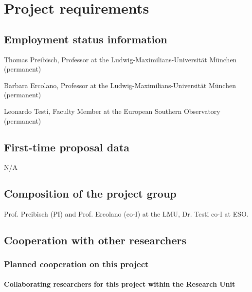\documentclass[10pt,fleqn,twoside]{article}
\begin{document}


\section{Project requirements}
\renewcommand{\leftmark}{\sc Project requirements}

\subsection{Employment status information}

Thomas Preibisch, Professor at the Ludwig-Maximilians-Universit\"at M\"unchen  (permanent)

Barbara Ercolano, Professor at the Ludwig-Maximilians-Universit\"at M\"unchen  (permanent)

Leonardo Testi, Faculty Member at the European Southern Observatory  (permanent)

\subsection{First-time proposal data}

N/A
\vspace{-2mm}

\subsection{Composition of the project group}

Prof. Preibisch (PI) and Prof. Ercolano (co-I) at the LMU, Dr. Testi
co-I at ESO. 


\subsection{Cooperation with other researchers}

\subsubsection{Planned cooperation on this project}

\paragraph{Collaborating researchers for this project within the
  Research Unit}
\end{document}
